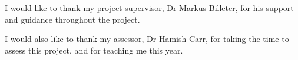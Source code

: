 I would like to thank my project supervisor, Dr Markus Billeter, for his support and guidance throughout the project.

I would also like to thank my assessor, Dr Hamish Carr, for taking the time to assess this project, and for teaching me this year.
